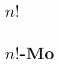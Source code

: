 \begin{spacing}{1.2}
         \section*{$n!$} \label{nthroot3}
         \Fa{
            
         }
         \newpage
         \section*{$n!$-Mo} \label{nthroot3Mo}
         \Mo{
            
         }
         \newpage

\end{spacing}


